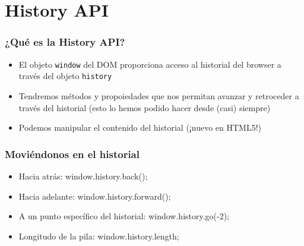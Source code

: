 
\section{History API}


\begin{frame}
\frametitle{¿Qué es la History API?}


\begin{itemize}
  \item El objeto \texttt{window} del DOM proporciona acceso al historial del browser a través del objeto \texttt{history}
  \item Tendremos métodos y propoiedades que nos permitan avanzar y retroceder a través del historial (esto lo hemos podido hacer desde (casi) siempre)
  \item Podemos manipular el contenido del historial (¡nuevo en HTML5!)
\end{itemize}

\end{frame}


\begin{frame}
\frametitle{Moviéndonos en el historial}


\begin{itemize}
  \item Hacia atrás: window.history.back();
  \item Hacia adelante: window.history.forward();
  \item A un punto específico del historial: window.history.go(-2);
  \item Longitudo de la pila: window.history.length;
\end{itemize}

\end{frame}



